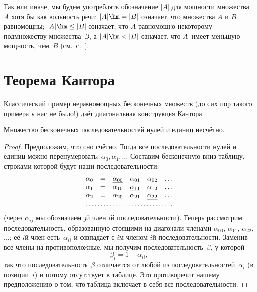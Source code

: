 Так или иначе, мы будем употреблять обозначение $|A|$ для
мощности множества~$A$ хотя бы как вольность речи: $|A|\hm=|B|$
означает, что множества $A$ и $B$ равномощны; $|A|\hm\le |B|$
означает, что $A$ равномощно некоторому подмножеству
множества~$B$, а $|A|\hm<|B|$ означает, что $A$~имеет
меньшую мощность, чем~$B$ (см.~с.~\pageref{comparing-cardinalities}).

\section{Теорема Кантора}
         \label{cantor}

Классический пример неравномощных бесконечных множеств (до сих
пор такого примера у нас не было!) даёт  диагональная
конструкция Кантора.

\begin{theorem}[Кантора]
        \label{continuum-diagonal}
Множество бесконечных последовательностей нулей и единиц
несчётно.
\end{theorem}

\begin{proof}
Предположим, что оно счётно. Тогда все последовательности нулей
и единиц можно перенумеровать: $\alpha_0,\alpha_1,\dots$
Составим бесконечную вниз таблицу, строками которой будут наши
последовательности:
        $$
\begin{array}{c}
\begin{array}{cccccc}
\alpha_0 & = & \underline{\alpha_{00}}&
            \alpha_{01} & \alpha_{02} & \ldots\\
\alpha_1 & = & \alpha_{10} & \underline{\alpha_{11}}& \alpha_{12} & \ldots\\
\alpha_2 & = & \alpha_{20} & \alpha_{21} & \underline{\alpha_{22}}& \ldots
\end{array}\\
\hbox to 4.5cm{\dotfill}
\end{array}
        $$
(через $\alpha_{ij}$ мы обозначаем $j$\д й член $i$\д й
последовательности). Теперь рассмотрим последовательность,
образованную стоящими на диагонали членами $\alpha_{00}$,
$\alpha_{11}$, $\alpha_{22}$, $\dots$; её $i$\д й член есть~$\alpha_{ii}$ и
совпадает с $i$\д м членом $i$\д й последовательности.
Заменив все члены на противоположные, мы получим
последовательность~$\beta$, у которой
        $$
\beta_{i}= 1 - \alpha_{ii},
        $$
так что последовательность~$\beta$ отличается от любой из
последовательностей~$\alpha_i$ (в позиции~$i$) и потому
отсутствует в таблице. Это противоречит нашему предположению о
том, что таблица включает в себя все последовательности.
\end{proof}

